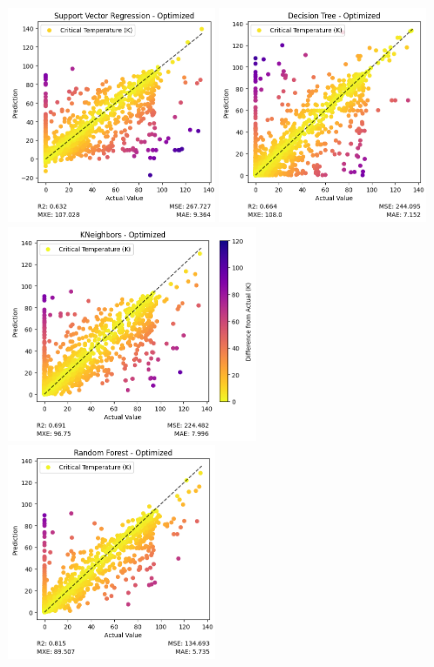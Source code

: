 \documentclass[twocolumn, nofootinbib, secnumarabic, amssymb, nobibnotes, aps, prd]{revtex4-2}
\begin{document}
\begin{figure}[!htb]
    \includegraphics[height=2.23in]{images/subfigures/no_uncertainty/support_vector_regression_optimized.png}
    \includegraphics[height=2.23in]{images/subfigures/no_uncertainty/decision_tree_optimized.png}
    \includegraphics[height=2.23in]{images/subfigures/no_uncertainty/kneighbors_optimized.png}
    \includegraphics[height=2.23in]{images/subfigures/no_uncertainty/random_forest_optimized.png}

\end{figure}
\end{document}
